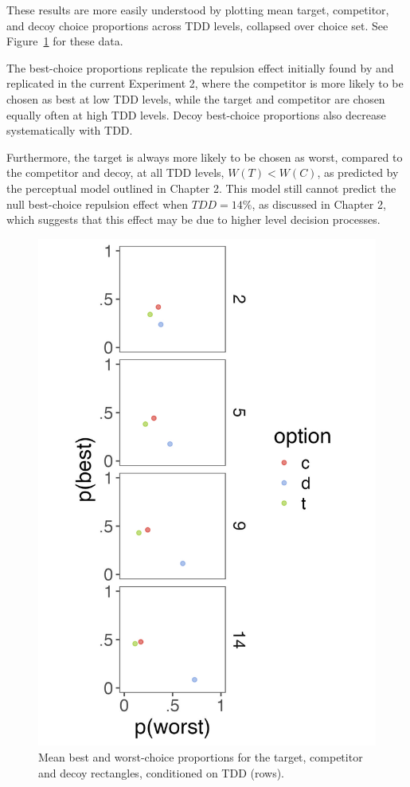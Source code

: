 These results are more easily understood by plotting mean target, competitor, and decoy choice proportions across TDD levels, collapsed over choice set. See Figure~\ref{fig:bw_mean_choice_collapsed} for these data. 

The best-choice proportions replicate the repulsion effect initially found by \textcite{spektorWhenGoodLooks2018b} and replicated in the current Experiment 2, where the competitor is more likely to be chosen as best at low TDD levels, while the target and competitor are chosen equally often at high TDD levels. Decoy best-choice proportions also decrease systematically with TDD. 

Furthermore, the target is always more likely to be chosen as worst, compared to the competitor and decoy, at all TDD levels, $W(T)<W(C)$, as predicted by the perceptual model outlined in Chapter 2. This model still cannot predict the null best-choice repulsion effect when $TDD=14\%$, as discussed in Chapter 2, which suggests that this effect may be due to higher level decision processes.

\begin{figure}
   \includegraphics[width=\linewidth]{figures/crit_mean_props_by_dist.jpeg}
   \caption{Mean best and worst-choice proportions for the target, competitor and decoy rectangles, conditioned on TDD (rows).}
   \label{fig:bw_mean_choice_collapsed}
\end{figure}

